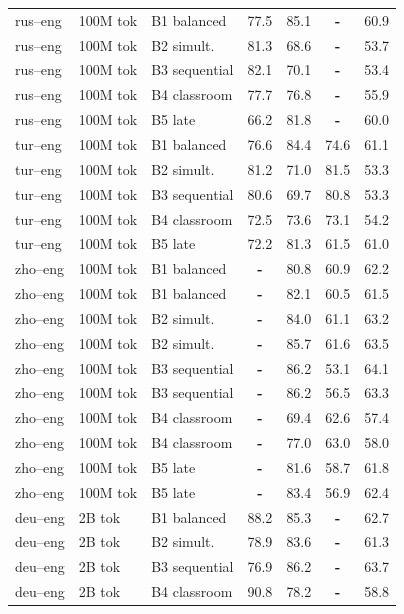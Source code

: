 \begin{table}[t]
\begin{tabular}{lll cc cc}
rus--eng & 100M tok & B1 balanced & 77.5 & 85.1 & \textbf{-} & 60.9 \\
rus--eng & 100M tok & B2 simult. & 81.3 & 68.6 & \textbf{-} & 53.7 \\
rus--eng & 100M tok & B3 sequential & 82.1 & 70.1 & \textbf{-} & 53.4 \\
rus--eng  & 100M tok & B4 classroom & 77.7 & 76.8 & \textbf{-} & 55.9 \\
rus--eng  & 100M tok & B5 late & 66.2 & 81.8 & \textbf{-} & 60.0 \\
tur--eng & 100M tok & B1 balanced & 76.6 & 84.4 & 74.6 & 61.1 \\
tur--eng & 100M tok & B2 simult. & 81.2 & 71.0 & 81.5 & 53.3 \\
tur--eng & 100M tok & B3 sequential & 80.6 & 69.7 & 80.8 & 53.3 \\
tur--eng  & 100M tok & B4 classroom & 72.5 & 73.6 & 73.1 & 54.2 \\
tur--eng  & 100M tok & B5 late & 72.2 & 81.3 & 61.5 & 61.0 \\
zho--eng & 100M tok & B1 balanced & \textbf{-} & 80.8 & 60.9 & 62.2 \\
zho--eng  & 100M tok & B1 balanced & \textbf{-} & 82.1 & 60.5 & 61.5 \\
zho--eng & 100M tok & B2 simult. & \textbf{-} & 84.0 & 61.1 & 63.2 \\
zho--eng  & 100M tok & B2 simult. & \textbf{-} & 85.7 & 61.6 & 63.5 \\
zho--eng & 100M tok & B3 sequential & \textbf{-} & 86.2 & 53.1 & 64.1 \\
zho--eng  & 100M tok & B3 sequential & \textbf{-} & 86.2 & 56.5 & 63.3 \\
zho--eng & 100M tok & B4 classroom & \textbf{-} & 69.4 & 62.6 & 57.4 \\
zho--eng  & 100M tok & B4 classroom & \textbf{-} & 77.0 & 63.0 & 58.0 \\
zho--eng & 100M tok & B5 late & \textbf{-} & 81.6 & 58.7 & 61.8 \\
zho--eng  & 100M tok & B5 late & \textbf{-} & 83.4 & 56.9 & 62.4 \\
\midrule
deu--eng & 2B tok & B1 balanced & 88.2 & 85.3 & \textbf{-} & 62.7 \\
deu--eng & 2B tok & B2 simult. & 78.9 & 83.6 & \textbf{-} & 61.3 \\
deu--eng & 2B tok & B3 sequential & 76.9 & 86.2 & \textbf{-} & 63.7 \\
deu--eng & 2B tok & B4 classroom & 90.8 & 78.2 & \textbf{-} & 58.8 \\

\end{tabular}
\end{table}
